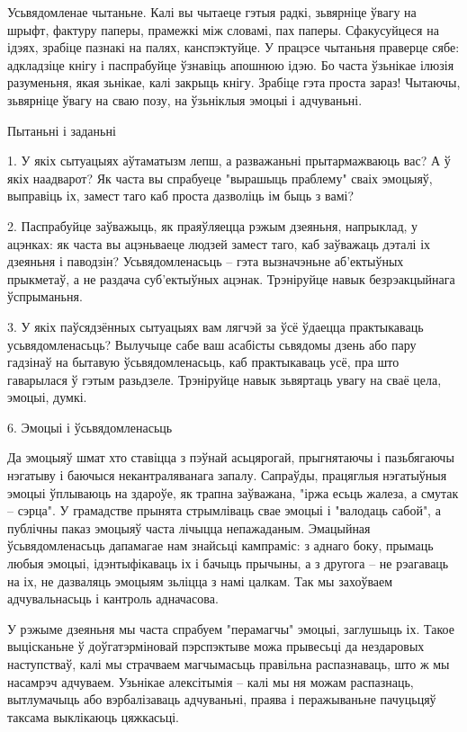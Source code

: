 Усьвядомленае чытаньне. Калі вы чытаеце гэтыя радкі, зьвярніце ўвагу на шрыфт, фактуру паперы, прамежкі між словамі, пах паперы. Сфакусуйцеся на ідэях, зрабіце пазнакі на палях, канспэктуйце. У працэсе чытаньня праверце сябе: адкладзіце кнігу і паспрабуйце ўзнавіць апошнюю ідэю. Бо часта ўзьнікае ілюзія разуменьня, якая зьнікае, калі закрыць кнігу. Зрабіце гэта проста зараз! Чытаючы, зьвярніце ўвагу на сваю позу, на ўзьніклыя эмоцыі і адчуваньні.

Пытаньні і заданьні

1. У якіх сытуацыях аўтаматызм лепш, а разважаньні прытармажваюць вас? А ў якіх наадварот? Як часта вы спрабуеце "вырашыць праблему" сваіх эмоцыяў, выправіць іх, замест таго каб проста дазволіць ім быць з вамі?

2. Паспрабуйце заўважыць, як праяўляецца рэжым дзеяньня, напрыклад, у ацэнках: як часта вы ацэньваеце людзей замест таго, каб заўважаць дэталі іх дзеяньня і паводзін? Усьвядомленасьць – гэта вызначэньне аб'ектыўных прыкметаў, а не раздача суб'ектыўных ацэнак. Трэніруйце навык безрэакцыйнага ўспрыманьня.

3. У якіх паўсядзённых сытуацыях вам лягчэй за ўсё ўдаецца практыкаваць усьвядомленасьць? Вылучыце сабе ваш асабісты сьвядомы дзень або пару гадзінаў на бытавую ўсьвядомленасьць, каб практыкаваць усё, пра што гаварылася ў гэтым разьдзеле. Трэніруйце навык зьвяртаць увагу на сваё цела, эмоцыі, думкі.


6. Эмоцыі і ўсьвядомленасьць

Да эмоцыяў шмат хто ставіцца з пэўнай асьцярогай, прыгнятаючы і пазьбягаючы нэгатыву і баючыся некантраляванага запалу. Сапраўды, працяглыя нэгатыўныя эмоцыі ўплываюць на здароўе, як трапна заўважана, "іржа есьць жалеза, а смутак – сэрца". У грамадстве прынята стрымліваць свае эмоцыі і "валодаць сабой", а публічны паказ эмоцыяў часта лічыцца непажаданым. Эмацыйная ўсьвядомленасьць дапамагае нам знайсьці кампраміс: з аднаго боку, прымаць любыя эмоцыі, ідэнтыфікаваць іх і бачыць прычыны, а з другога – не рэагаваць на іх, не дазваляць эмоцыям зьліцца з намі цалкам. Так мы захоўваем адчувальнасьць і кантроль адначасова.

У рэжыме дзеяньня мы часта спрабуем "перамагчы" эмоцыі, заглушыць іх. Такое выцісканьне ў доўгатэрміновай пэрспэктыве можа прывесьці да нездаровых наступстваў, калі мы страчваем магчымасьць правільна распазнаваць, што ж мы насамрэч адчуваем. Узьнікае алексітымія – калі мы ня можам распазнаць, вытлумачыць або вэрбалізаваць адчуваньні, праява і перажываньне пачуцьцяў таксама выклікаюць цяжкасьці.

